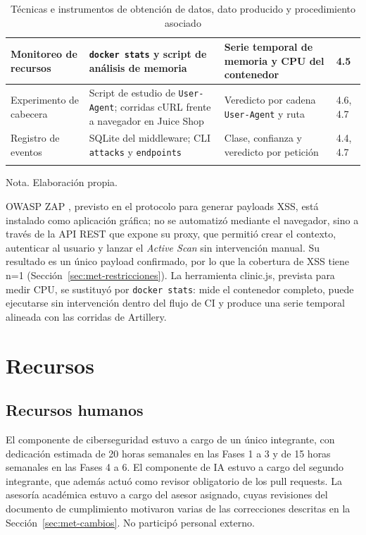 \begin{longtable}{|L{2.7cm}|L{3.7cm}|L{3.6cm}|L{2.6cm}|}
Monitoreo de recursos & \texttt{docker stats} y script de análisis de memoria & Serie temporal de memoria y CPU del contenedor & 4.5 \\ \hline
Experimento de cabecera & Script de estudio de \texttt{User-Agent}; corridas cURL frente a
navegador en Juice Shop & Veredicto por cadena \texttt{User-Agent} y ruta & 4.6, 4.7 \\ \hline
Registro de eventos & SQLite del middleware; CLI \texttt{attacks} y \texttt{endpoints} & Clase,
confianza y veredicto por petición & 4.4, 4.7 \\ \hline
\caption[Técnicas e instrumentos de obtención de datos]{Técnicas e instrumentos de obtención de datos, dato producido y procedimiento asociado}
\label{tab:met-instrumentos}
\end{longtable}
{\footnotesize Nota. Elaboración propia.}

OWASP ZAP \cite{owaspzap}, previsto en el protocolo para generar payloads XSS, está instalado como
aplicación gráfica; no se automatizó mediante el navegador, sino a través de la API REST que expone
su proxy, que permitió crear el contexto, autenticar al usuario y lanzar el \textit{Active Scan}
sin intervención manual. Su resultado es un único payload confirmado, por lo que la cobertura de
XSS tiene n=1 (Sección~\ref{sec:met-restricciones}). La herramienta
clinic.js, prevista para medir CPU, se sustituyó por \texttt{docker stats}: mide el contenedor
completo, puede ejecutarse sin intervención dentro del flujo de CI y produce una serie temporal
alineada con las corridas de Artillery.

\section{Recursos}
\label{sec:met-recursos}

\subsection{Recursos humanos}
El componente de ciberseguridad estuvo a cargo de un único integrante, con dedicación estimada
de 20 horas semanales en las Fases 1 a 3 y de 15 horas semanales en las Fases 4 a 6. El
componente de IA estuvo a cargo del segundo integrante, que además actuó como revisor obligatorio
de los pull requests. La asesoría académica estuvo a cargo del asesor asignado, cuyas revisiones
del documento de cumplimiento motivaron varias de las correcciones descritas en la
Sección~\ref{sec:met-cambios}. No participó personal externo.

